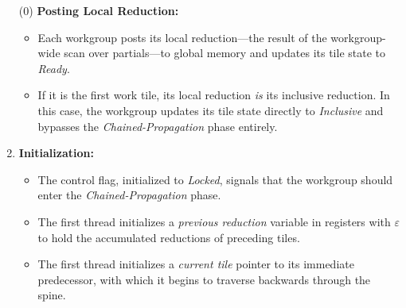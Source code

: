 \documentclass[sigconf]{acmart}
\begin{document}
\begin{enumerate}
  \item[(0)] \textbf{Posting Local Reduction:}
        \begin{itemize}
          \item Each workgroup posts its local reduction---the result of the workgroup-wide scan over partials---to global memory and updates its tile state to \emph{Ready}.
          \item If it is the first work tile, its local reduction \emph{is} its inclusive reduction. In this case, the workgroup updates its tile state directly to \emph{Inclusive} and bypasses the \emph{Chained-Propagation} phase entirely.
        \end{itemize}

  \item \textbf{Initialization:}
        \begin{itemize}
          \item The control flag, initialized to \emph{Locked}, signals that the workgroup should enter the \emph{Chained-Propagation} phase.
          \item The first thread initializes a \emph{previous reduction} variable in registers with $\varepsilon$ to hold the accumulated reductions of preceding tiles.
          \item The first thread initializes a \emph{current tile} pointer to its immediate predecessor, with which it begins to traverse backwards through the spine.
        \end{itemize}


\end{enumerate}
\end{document}
